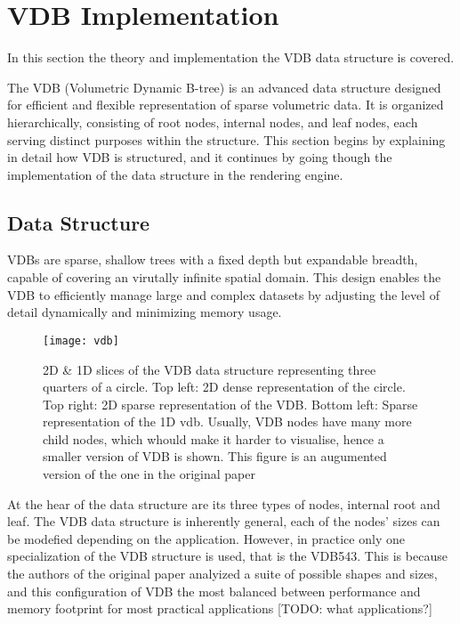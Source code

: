 \section{VDB Implementation}

In this section the theory and implementation the VDB data structure is covered.

The VDB (Volumetric Dynamic B-tree) is an advanced data structure designed for efficient and flexible representation of sparse volumetric data. It is organized hierarchically, consisting of root nodes, internal nodes, and leaf nodes, each serving distinct purposes within the structure. This section begins by explaining in detail how VDB is structured, and it continues by going though the implementation of the data structure in the rendering engine.

\subsection{Data Structure}
\label{vdb:ds}

VDBs are sparse, shallow trees with a fixed depth but expandable breadth, capable of covering an virutally infinite spatial domain. This design enables the VDB to efficiently manage large and complex datasets by adjusting the level of detail dynamically and minimizing memory usage.

\begin{figure}[H]
  \centering
  \texttt{[image: vdb]}
  \caption{2D \& 1D slices of the VDB data structure representing three quarters of a circle. Top left: 2D dense representation of the circle. Top right: 2D sparse representation of the VDB. Bottom left: Sparse representation of the 1D vdb. Usually, VDB nodes have many more child nodes, which whould make it harder to visualise, hence a smaller version of VDB is shown. This figure is an augumented version of the one in the original paper\supercite{vdb2013}}
\end{figure}

At the hear of the data structure are its three types of nodes, internal root and leaf. The VDB data structure is inherently general, each of the nodes' sizes can be modefied depending on the application. However, in practice only one specialization of the VDB structure is used, that is the VDB543. This is because the authors of the original paper\supercite{vdb2013} analyized a suite of possible shapes and sizes, and this configuration of VDB the most balanced between performance and memory footprint for most practical applications [TODO: what applications?]

